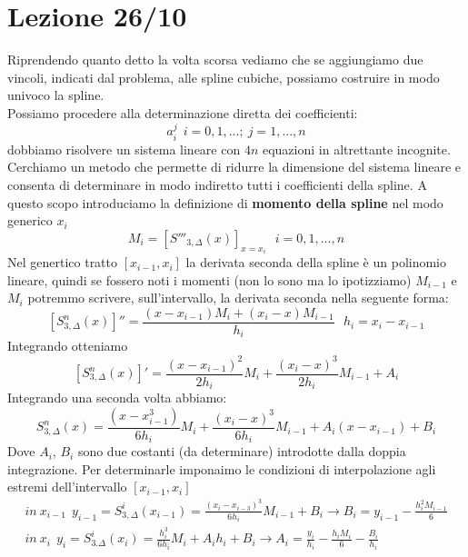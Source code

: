 \documentclass[a4paper, portrait]{book}
\numberwithin{equation}{chapter} %
\begin{document}
\chapter{Lezione 26/10}
Riprendendo quanto detto la volta scorsa vediamo che se aggiungiamo due vincoli, indicati dal problema, alle spline cubiche, possiamo costruire in modo univoco la spline.\\
Possiamo procedere alla determinazione diretta dei coefficienti:
\begin{equation}
    a_i^j  \ \ i = 0,1,...; \ j = 1,...,n
\end{equation}
dobbiamo risolvere un sistema lineare con $4n$ equazioni in altrettante incognite.\\
Cerchiamo un metodo che permette di ridurre la dimensione del sistema lineare e consenta di determinare in modo indiretto tutti i coefficienti della spline. A questo scopo introduciamo la definizione di \textbf{momento della spline} nel modo generico $x_i$
\begin{equation}
    M_i = \left[S'''_{3,\Delta}(x)\right]_{x = x_i} \ \ \ i = 0,1,...,n
\end{equation}
Nel genertico tratto $[x_{i-1},x_i]$ la derivata seconda della spline è un polinomio lineare, quindi se fossero noti i momenti (non lo sono ma lo ipotizziamo) $M_{i-1}$ e $M_i$ potremmo scrivere, sull'intervallo, la derivata seconda nella seguente forma:
\begin{equation}
    \left[S_{3,\Delta}^n(x)\right]'' = \frac{(x-x_{i-1})M_i+(x_i-x)M_{i-1}}{h_i} \ \ \ h_i = x_i - x_{i-1}
\end{equation}
Integrando otteniamo
\begin{equation}
    \left[S_{3,\Delta}^n(x)\right]' = \frac{(x-x_{i-1})^2}{2h_i}M_i + \frac{(x_i-x)^3}{2h_i}M_{i-1}+A_i
\end{equation}
Integrando una seconda volta abbiamo:
\begin{equation}
    S_{3,\Delta}^n (x) = \frac{(x-x_{i-1}^3)}{6h_i}M_i + \frac{(x_i - x)^3}{6h_i}M_{i-1} + A_i(x-x_{i-1}) + B_i
\end{equation}
Dove $A_i$, $B_i$ sono due costanti (da determinare) introdotte dalla doppia integrazione. Per determinarle imponaimo le condizioni di interpolazione agli estremi dell'intervallo $[x_{i-1},x_i]$
\begin{gather}
    in \ x_{i-1} \ \ y_{i-1} = S^i_{3,\Delta}(x_{i-1}) = \frac{(x_i-x_{i-3})^3}{6h_i}M_{i-1}+B_i \rightarrow B_i = y_{i-1}-\frac{h_i^2M_{i-1}}{6}\\
    in \ x_i \ \ y_i = S_{3.\Delta}^i(x_i) = \frac{h_i^3}{6h_i}M_i + A_ih_i + B_i \rightarrow A_i = \frac{y_i}{h_i}-\frac{h_iM_i}{6}-\frac{B_i}{h_i}
\end{gather}
\end{document}
